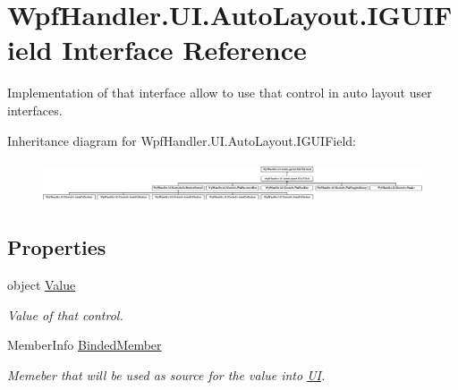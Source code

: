 \hypertarget{interface_wpf_handler_1_1_u_i_1_1_auto_layout_1_1_i_g_u_i_field}{}\section{Wpf\+Handler.\+U\+I.\+Auto\+Layout.\+I\+G\+U\+I\+Field Interface Reference}
\label{interface_wpf_handler_1_1_u_i_1_1_auto_layout_1_1_i_g_u_i_field}


Implementation of that interface allow to use that control in auto layout user interfaces.  


Inheritance diagram for Wpf\+Handler.\+U\+I.\+Auto\+Layout.\+I\+G\+U\+I\+Field\+:\begin{figure}[H]
\begin{center}
\leavevmode
\includegraphics[height=1.245136cm]{d3/dac/interface_wpf_handler_1_1_u_i_1_1_auto_layout_1_1_i_g_u_i_field}
\end{center}
\end{figure}
\subsection*{Properties}
\begin{DoxyCompactItemize}
\item 
object \mbox{\hyperlink{interface_wpf_handler_1_1_u_i_1_1_auto_layout_1_1_i_g_u_i_field_a6603f5bb3eeee52e2d061d6d0f40720a}{Value}}
\begin{DoxyCompactList}\small\item\em Value of that control. \end{DoxyCompactList}\item 
Member\+Info \mbox{\hyperlink{interface_wpf_handler_1_1_u_i_1_1_auto_layout_1_1_i_g_u_i_field_a063a35928be8b8f839f560d3c8af33e7}{Binded\+Member}}
\begin{DoxyCompactList}\small\item\em Memeber that will be used as source for the value into \mbox{\hyperlink{namespace_wpf_handler_1_1_u_i}{UI}}. \end{DoxyCompactList}\end{DoxyCompactItemize}
